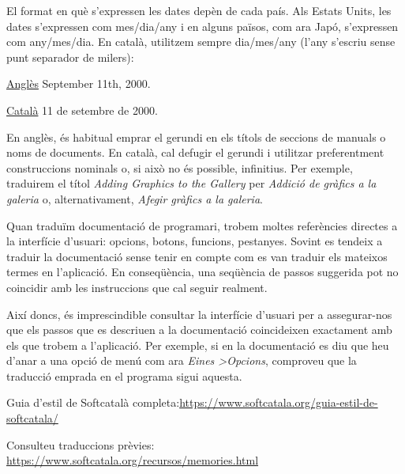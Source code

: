 \documentclass[9pt]{cheatsheet}
\begin{document}
\begin{multicols*}{3}
El format en què s'expressen les dates depèn de cada país. Als Estats Units, les dates s'expressen com mes/dia/any i en alguns països, com ara Japó, s'expressen com any/mes/dia. En català, utilitzem sempre dia/mes/any (l'any s'escriu sense punt separador de milers):

\underline {Anglès} September 11th, 2000.

\underline {Català}	11 de setembre de 2000.



En anglès, és habitual emprar el gerundi en els títols de seccions de manuals o noms de documents. En català, cal defugir el gerundi i utilitzar preferentment construccions nominals o, si això no és possible, infinitius. Per exemple, traduirem el títol \emph{Adding Graphics to the Gallery} per \emph{Addició de gràfics a la galeria} o, alternativament, \emph{Afegir gràfics a la galeria}.


Quan traduïm documentació de programari, trobem moltes referències directes a la interfície d'usuari: opcions, botons, funcions, pestanyes. Sovint es tendeix a traduir la documentació sense tenir en compte com es van traduir els mateixos termes en l'aplicació. En conseqüència, una seqüència de passos suggerida pot no coincidir amb les instruccions que cal seguir realment. 

Així doncs, és imprescindible consultar la interfície d'usuari per a assegurar-nos que els passos que es descriuen a la documentació coincideixen exactament amb els que trobem a l'aplicació. Per exemple, si en la documentació es diu que heu d'anar a una opció de menú com ara \emph{Eines \textgreater  Opcions}, comproveu que la traducció emprada en el programa sigui aquesta.


Guia d'estil de Softcatalà completa:\url{https://www.softcatala.org/guia-estil-de-softcatala/}

Consulteu traduccions prèvies: \url{https://www.softcatala.org/recursos/memories.html}

\end{multicols*}
\end{document}
